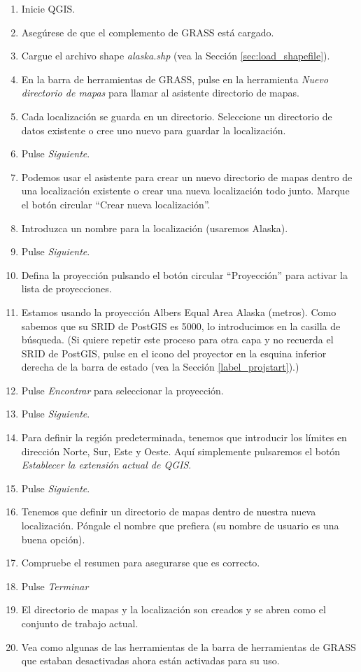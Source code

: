 \begin{enumerate}
  \item Inicie QGIS.
  \item Asegúrese de que el complemento de GRASS está cargado.
  \item Cargue el archivo shape \textsl{alaska.shp} (vea la Sección \ref{sec:load_shapefile}).
  \item En la barra de herramientas de GRASS, pulse en la herramienta \textsl{Nuevo directorio de mapas} para llamar al asistente directorio de mapas.
  \item Cada localización se guarda en un directorio. Seleccione un directorio de datos existente o cree uno nuevo para guardar la localización.
  \item Pulse \textsl{Siguiente}.
  \item Podemos usar el asistente para crear un nuevo directorio de mapas dentro de una localización existente o crear una nueva localización todo junto. Marque el botón circular ``Crear nueva localización''.
  \item Introduzca un nombre para la localización (usaremos Alaska).
  \item Pulse \textsl{Siguiente}.
  \item Defina la proyección pulsando el botón circular ``Proyección'' para activar la lista de proyecciones.
  \item Estamos usando la proyección Albers Equal Area Alaska (metros). Como sabemos que su SRID de PostGIS es 5000, lo introducimos en la casilla de búsqueda. (Si quiere repetir este proceso para otra capa y no recuerda el SRID de PostGIS, pulse en el icono del proyector en la esquina inferior derecha de la barra de estado (vea la Sección \ref{label_projstart}).)
  \item Pulse \textsl{Encontrar} para seleccionar la proyección.
  \item Pulse \textsl{Siguiente}.
  \item Para definir la región predeterminada, tenemos que introducir los límites en dirección Norte, Sur, Este y Oeste. Aquí simplemente pulsaremos el botón \textsl{Establecer la extensión actual de QGIS}.
  \item Pulse \textsl{Siguiente}. 
  \item Tenemos que definir un directorio de mapas dentro de nuestra nueva localización. Póngale el nombre que prefiera (su nombre de usuario es una buena opción).
  \item Compruebe el resumen para asegurarse que es correcto.
  \item Pulse \textsl{Terminar} 
  \item El directorio de mapas y la localización son creados y se abren como el conjunto de trabajo actual.
  \item Vea como algunas de las herramientas de la barra de herramientas de GRASS que estaban desactivadas ahora están activadas para su uso.
\end{enumerate}

